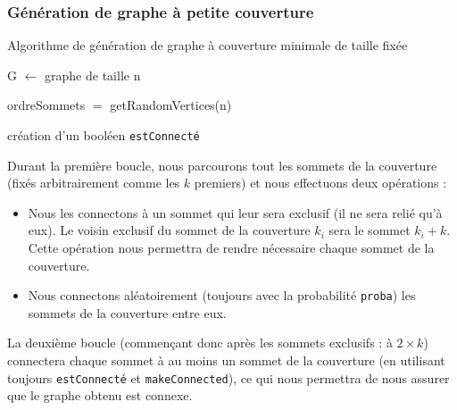 \documentclass[a4paper,10pt]{article}
\newcommand*{\itemb}{\item[$\bullet$]}
\begin{document}
\subsubsection{Génération de graphe à petite couverture}

\begin{algorithm}[H]
\caption{Algorithme de génération de graphe à couverture minimale de taille fixée}
\BlankLine
G $\leftarrow$ graphe de taille n

ordreSommets $=$ getRandomVertices(n)


création d'un booléen \texttt{estConnecté}



\end{algorithm}
\bigskip

Durant la première boucle, nous parcourons tout les sommets de la couverture (fixés arbitrairement comme les $k$ premiers) et nous effectuons deux opérations :
\begin{itemize}
\itemb Nous les connectons à un sommet qui leur sera exclusif (il ne sera relié qu'à eux). Le voisin exclusif du sommet de la couverture $k_i$ sera le sommet $k_i+k$. Cette opération nous permettra de rendre nécessaire chaque sommet de la couverture.
\itemb Nous connectons aléatoirement (toujours avec la probabilité \texttt{proba}) les sommets de la couverture entre eux.
\end{itemize}
\bigskip
La deuxième boucle (commençant donc après les sommets exclusifs : à $2\times k$) connectera chaque sommet à au moins un sommet de la couverture (en utilisant toujours \texttt{estConnecté} et \texttt{makeConnected}), ce qui nous permettra de nous assurer que le graphe obtenu est connexe.
\bigskip
\end{document}
